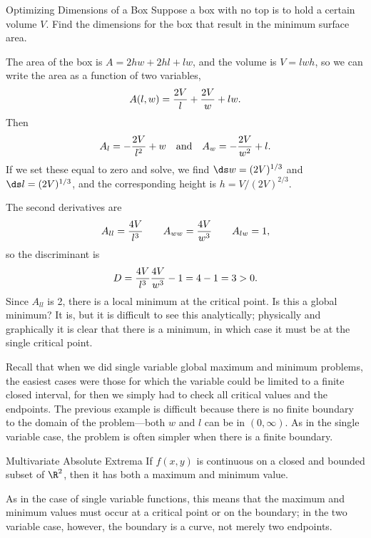 \begin{example}{Optimizing Dimensions of a Box}{}
Suppose a box with no top is to hold a certain volume $V$. Find
the dimensions for the box that result in the minimum surface area.
\end{example}
\begin{solution}
The area of the box is $A=2hw+2hl+lw$, and the volume is $V=lwh$, so
we can write the area as a function of two variables,
$$A(l,w)={2V\over l}+{2V\over w}+lw.$$
Then
$$A_l=-{2V\over l^2}+w \hbox{\quad and\quad} A_w=-{2V\over w^2}+l.$$
If we set these equal to zero and solve, we find
$\ds w=(2V)^{1/3}$ and $\ds l=(2V)^{1/3}$, and the corresponding
height is $h=V/(2V)^{2/3}$.

The second derivatives are
$$A_{ll}={4V\over l^3}\qquad A_{ww}={4V\over w^3}\qquad
A_{lw}=1,$$
so the discriminant is
$$D={4V\over l^3}{4V\over w^3}-1=4-1=3>0.$$
Since $A_{ll}$ is 2, there is a local minimum at the critical point.
Is this a global minimum? It is, but it is difficult to see this
analytically; physically and graphically it is clear that there is a
minimum, in which case it must be at the single critical point. 
\end{solution}

Recall that when we did single variable global maximum and minimum
problems, the easiest cases were those for which the variable could be
limited to a finite closed interval, for then we simply had to check
all critical values and the endpoints. The previous example is
difficult because there is no finite boundary to the domain of the
problem---both $w$ and $l$ can be in $(0,\infty)$. As in the single
variable case, the problem is often simpler when there is a finite
boundary. 

\begin{theorem}{Multivariate Absolute Extrema}{}
If $f(x,y)$ is continuous on a closed and bounded subset of
$\R^2$, then it has both a maximum and minimum value.
\end{theorem}

As in the case of single variable functions, this means that the
maximum and minimum values must occur at a critical point or on the
boundary; in the two variable case, however, the boundary is a curve,
not merely two endpoints.

